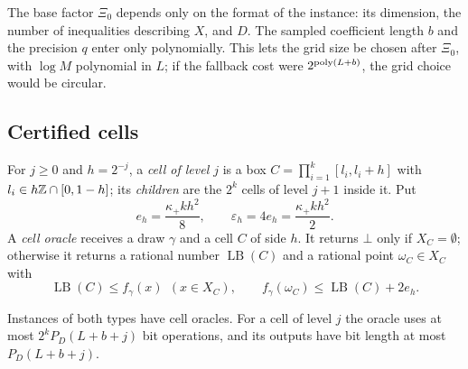 The base factor $\Xi_0$ depends only on the format of the instance:
its dimension, the number of inequalities describing $X$, and $D$. The
sampled coefficient length $b$ and the precision $q$ enter only
polynomially. This lets the grid size be chosen after $\Xi_0$, with
$\log M$ polynomial in $L$; if the fallback cost were
$2^{\operatorname{poly}(L+b)}$, the grid choice would be circular.

\subsection{Certified cells}
\label{app:recourse-cells}

For $j\ge0$ and $h=2^{-j}$, a \emph{cell of level $j$} is a box
$C=\prod_{i=1}^k[l_i,l_i+h]$ with $l_i\in h\mathbb Z\cap[0,1-h]$; its
\emph{children} are the $2^k$ cells of level $j+1$ inside it. Put
\[
 e_h=\frac{\kappa_+kh^2}8,\qquad \varepsilon_h=4e_h=\frac{\kappa_+kh^2}2 .
\]
A \emph{cell oracle} receives a draw $\gamma$ and a cell $C$ of side $h$.
It returns $\bot$ only if $X_C=\emptyset$; otherwise it returns a
rational number $\operatorname{LB}(C)$ and a rational point
$\omega_C\in X_C$ with
\begin{equation}
 \operatorname{LB}(C)\le f_\gamma(x)\ \ (x\in X_C),\qquad
 f_\gamma(\omega_C)\le\operatorname{LB}(C)+2e_h .
 \label{eq:recourse-cell-oracle}
\end{equation}

\begin{lemma}
\label{lem:recourse-cell-oracle}
Instances of both types have cell oracles. For a cell of level $j$ the
oracle uses at most $2^kP_D(L+b+j)$ bit operations, and its outputs
have bit length at most $P_D(L+b+j)$.
\end{lemma}

